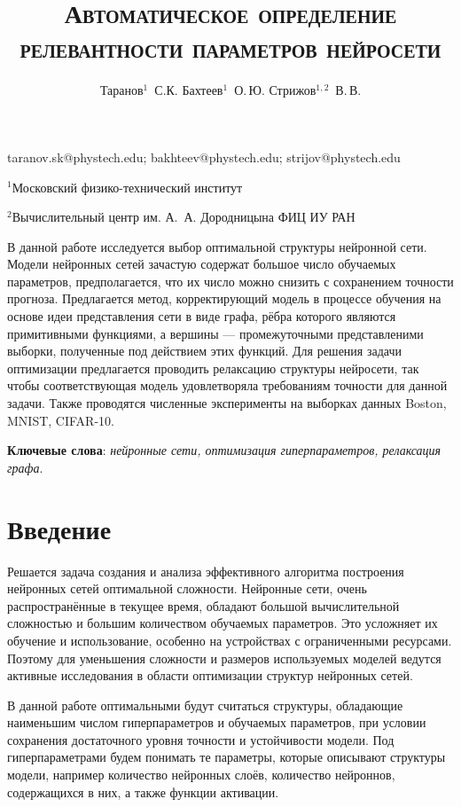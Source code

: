 \documentclass[12pt, twoside]{article}
\begin{document}
\title{\textsc{Автоматическое определение релевантности параметров нейросети}}

\author
    {Таранов$^1$~С.К. Бахтеев$^1$~О.\,Ю.  Стрижов$^{1,2}$~В.\,В.} 

\email
    {taranov.sk@phystech.edu; bakhteev@phystech.edu; strijov@phystech.edu}
    
\organization
    {$^1$Московский физико-технический институт\par
    $^2$Вычислительный центр им. А.~А. Дородницына ФИЦ ИУ РАН}

\abstract
	{В данной работе исследуется выбор оптимальной структуры нейронной сети.  Модели нейронных сетей зачастую содержат большое число обучаемых параметров, предполагается, что их число можно снизить с сохранением точности прогноза. Предлагается метод, корректирующий модель в процессе обучения на основе идеи представления сети в виде графа, рёбра которого являются примитивными функциями, а вершины --- промежуточными представленими выборки, полученные под действием этих функций. Для решения задачи оптимизации предлагается проводить релаксацию структуры нейросети, так чтобы соответствующая модель удовлетворяла требованиям точности для данной задачи. Также проводятся численные эксперименты на выборках данных Boston, MNIST, CIFAR-10.

\bigskip
\textbf{Ключевые слова}: \emph {нейронные сети, оптимизация гиперпараметров, релаксация графа}.

}

\maketitle

\section{Введение}
Решается задача создания и анализа эффективного алгоритма построения нейронных сетей оптимальной сложности. Нейронные сети, очень распространённые в текущее время, обладают большой вычислительной сложностью и большим количеством обучаемых параметров. Это усложняет их обучение и использование, особенно на устройствах с ограниченными ресурсами. Поэтому для уменьшения сложности и размеров используемых моделей ведутся активные исследования в области оптимизации структур нейронных сетей. 

В данной работе оптимальными будут считаться структуры, обладающие наименьшим числом гиперпараметров и обучаемых параметров, при условии сохранения достаточного уровня точности и устойчивости модели. Под гиперпараметрами будем понимать те параметры, которые описывают структуры модели, например количество нейронных слоёв, количество нейроннов, содержащихся в них, а также функции активации. 
\end{document}
